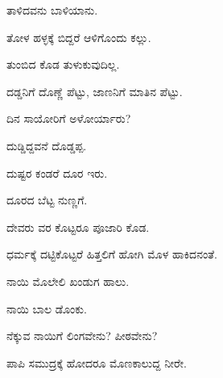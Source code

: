 \noindent\hspace*{0.6em}\kbvbullet\hspace{0.55em}ತಾಳಿದವನು ಬಾಳಿಯಾನು.\par

\noindent\hspace*{0.6em}\kbvbullet\hspace{0.55em}ತೋಳ ಹಳ್ಳಕ್ಕೆ ಬಿದ್ದರೆ ಆಳಿಗೊಂದು ಕಲ್ಲು.\par

\noindent\hspace*{0.6em}\kbvbullet\hspace{0.55em}ತುಂಬಿದ ಕೊಡ ತುಳುಕುವುದಿಲ್ಲ.\par

\noindent\hspace*{0.6em}\kbvbullet\hspace{0.55em}ದಡ್ಡನಿಗೆ ದೊಣ್ಣೆ ಪೆಟ್ಟು, ಜಾಣನಿಗೆ ಮಾತಿನ ಪೆಟ್ಟು.\par

\noindent\hspace*{0.6em}\kbvbullet\hspace{0.55em}ದಿನ ಸಾಯೋರಿಗೆ ಅಳೋರ್ಯಾರು?\par

\noindent\hspace*{0.6em}\kbvbullet\hspace{0.55em}ದುಡ್ಡಿದ್ದವನೆ ದೊಡ್ಡಪ್ಪ.\par

\noindent\hspace*{0.6em}\kbvbullet\hspace{0.55em}ದುಷ್ಟರ ಕಂಡರೆ ದೂರ ಇರು.\par

\noindent\hspace*{0.6em}\kbvbullet\hspace{0.55em}ದೂರದ ಬೆಟ್ಟ ನುಣ್ಣಗೆ.\par

\noindent\hspace*{0.6em}\kbvbullet\hspace{0.55em}ದೇವರು ವರ ಕೊಟ್ಟರೂ ಪೂಜಾರಿ ಕೊಡ.\par

\noindent\hspace*{0.6em}\kbvbullet\hspace{0.55em}ಧರ್ಮಕ್ಕೆ ದಟ್ಟಿಕೊಟ್ಟರೆ ಹಿತ್ತಲಿಗೆ ಹೋಗಿ ಮೊಳ ಹಾಕಿದನಂತೆ.\par

\noindent\hspace*{0.6em}\kbvbullet\hspace{0.55em}ನಾಯಿ ಮೊಲೇಲಿ ಖಂಡುಗ ಹಾಲು.\par

\noindent\hspace*{0.6em}\kbvbullet\hspace{0.55em}ನಾಯಿ ಬಾಲ ಡೊಂಕು.\par

\noindent\hspace*{0.6em}\kbvbullet\hspace{0.55em}ನೆಕ್ಕುವ ನಾಯಿಗೆ ಲಿಂಗವೇನು? ಪೀಠವೇನು?\par

\noindent\hspace*{0.6em}\kbvbullet\hspace{0.55em}ಪಾಪಿ ಸಮುದ್ರಕ್ಕೆ ಹೋದರೂ ಮೊಣಕಾಲುದ್ದ ನೀರೇ.\par
